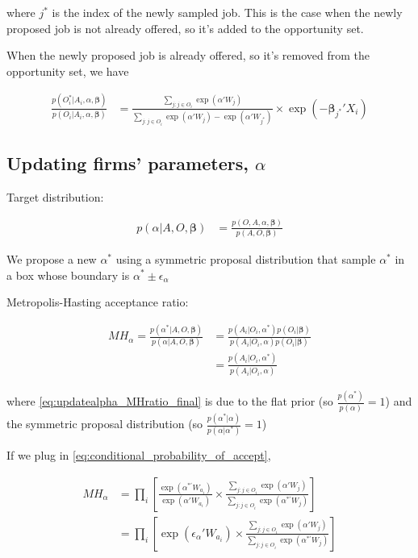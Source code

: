where $j^*$ is the index of the newly sampled job. This is the case when the newly proposed job is not already offered, so it's added to the opportunity set.

When the newly proposed job is already offered, so it's removed from the opportunity set, we have

\begin{align}
\frac{p(O_i^* | A_i, \alpha, \bm{\beta})}{p(O_i | A_i, \alpha, \bm{\beta})} &= \frac{\sum\limits_{j:j \in O_i} \exp(\alpha'W_j)}{\sum\limits_{j:j \in O_i} \exp(\alpha'W_j) - \exp(\alpha' W_{j^*})} \times \exp(- \bm{\beta}_{j^*}'X_i)
\end{align}

\subsection{Updating firms' parameters, $\alpha$}

Target distribution:

\begin{align}
p(\alpha | A, O, \bm{\beta}) &= \frac{p(O, A, \alpha, \bm{\beta})}{p(A, O, \bm{\beta})}
\end{align}

We propose a new $\alpha^*$ using a symmetric proposal distribution that sample $\alpha^*$ in a box whose boundary is $\alpha^* \pm \epsilon_\alpha$

Metropolis-Hasting acceptance ratio:

\begin{align}
MH_\alpha = \frac{p(\alpha^* | A, O, \bm{\beta})}{p(\alpha | A, O, \bm{\beta})} &= \frac{p(A_i | O_i, \alpha^*)p(O_i|\bm{\beta})}{p(A_i | O_i, \alpha)p(O_i|\bm{\beta})} \\
&= \frac{p(A_i | O_i, \alpha^*)}{p(A_i | O_i, \alpha)} \label{eq:updatealpha_MHratio_final}
\end{align}

where \eqref{eq:updatealpha_MHratio_final} is due to the flat prior (so $\frac{p(\alpha^*)}{p(\alpha)}=1$) and the symmetric proposal distribution (so $\frac{p(\alpha^*|\alpha)}{p(\alpha|\alpha^*)} = 1$)

If we plug in \eqref{eq:conditional_probability_of_accept},

\begin{align}
MH_\alpha &= \prod_i \left[ \frac{\exp(\alpha^{*\prime} W_{a_i})}{\exp(\alpha' W_{a_i})} \times \frac{\sum\limits_{j:j \in O_i} \exp(\alpha' W_j)}{\sum\limits_{j:j \in O_i} \exp(\alpha^{*\prime}W_j)} \right] \\
&= \prod_i \left[ \exp(\epsilon_\alpha ' W_{a_i}) \times \frac{\sum\limits_{j:j \in O_i} \exp(\alpha' W_j)}{\sum\limits_{j:j \in O_i} \exp(\alpha^{*\prime}W_j)} \right]
\end{align}

